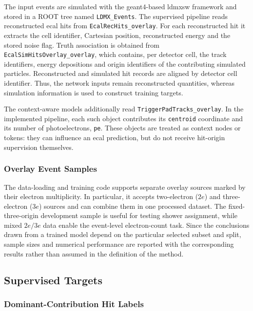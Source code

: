 The input events are simulated with the \gls{geant4}-based \gls{ldmxsw}
framework and stored in a ROOT tree named \texttt{LDMX\_Events}. The
supervised pipeline reads reconstructed \gls{ecal} hits from
\texttt{EcalRecHits\_overlay}. For each reconstructed hit it extracts the
cell identifier, Cartesian position, reconstructed energy and the stored
noise flag. Truth association is obtained from
\texttt{EcalSimHitsOverlay\_overlay}, which contains, per detector cell, the
track identifiers, energy depositions and origin identifiers of the
contributing simulated particles. Reconstructed and simulated hit records are
aligned by detector cell identifier. Thus, the network inputs remain
reconstructed quantities, whereas simulation information is used to construct
training targets.

The context-aware models additionally read
\texttt{TriggerPadTracks\_overlay}. In the implemented pipeline, each such
object contributes its \texttt{centroid} coordinate and its number of
photoelectrons, \texttt{pe}. These objects are treated as context nodes or
tokens: they can influence an \gls{ecal} prediction, but do not receive
hit-origin supervision themselves.

\subsubsection{Overlay Event Samples}

The data-loading and training code supports separate overlay sources marked
by their electron multiplicity. In particular, it accepts two-electron
(\(2e\)) and three-electron (\(3e\)) sources and can combine them in one
processed dataset. The fixed-three-origin development sample is useful for
testing shower assignment, while mixed \(2e/3e\) data enable the event-level
electron-count task. Since the conclusions drawn from a trained model depend
on the particular selected subset and split, sample sizes and numerical
performance are reported with the corresponding results rather than assumed
in the definition of the method.

\subsection{Supervised Targets}
\label{sec:method_targets}

\subsubsection{Dominant-Contribution Hit Labels}

